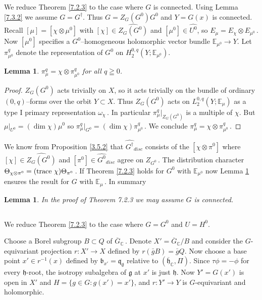\documentclass{conm-p-l}
\newtheorem{lemma}[equation]{Lemma}
\renewcommand{\gg}{\mathfrak{g}}
\newcommand{\gq}{\mathfrak{q}}
\def\gb{\mathfrak{b}}
\def\gg{\mathfrak{g}}
\def\gh{\mathfrak{h}}
\def\gq{\mathfrak{q}}
\def\trace{{\rm trace\,\,}}
\def\C{\mathbb{C}}
\def\E{\mathbb{E}}
\begin{document}
\subsection{}\label{ssec7d}\setcounter{equation}{0}
We reduce Theorem \ref{7.2.3} to the case where $G$
is connected.  Using Lemma \ref{7.3.2} we assume $G = G^\dagger$.  Thus
$G = Z_G(G^0)G^0$ and $Y = G(x)$ is connected.  Recall
$[\mu] = [\chi \otimes \mu^0]$ with $[\chi] \in \widehat{Z_G(G^0)}$
and $[\mu^0] \in \widehat{U^0}$, so $E_\mu = E_\chi \otimes E_{\mu^0}$\,.
Now $[\mu^0]$ specifies a $G^0$--homogeneous holomorphic vector
bundle $\E_{\mu^0} \to Y$.  Let $\pi^q_{\mu^0}$ denote the representation
of $G^0$ on $H^{0,q}_2(Y;\E_{\mu^0})$.

\begin{lemma}\label{7.4.1}
$\pi^q_{\mu} = \chi \otimes \pi^q_{\mu^0}$
for all $q \geqq 0$.
\end{lemma}

\begin{proof} $Z_G(G^0)$ acts trivially on $X$, so it acts trivially
on the bundle of ordinary $(0,q)$--forms over the orbit $Y \subset X$.
Thus $Z_G(G^0)$ acts on $L_2^{0,q}(Y;\E_\mu)$ as a type I primary 
representation $\omega_\chi$\,.  In particular $\pi_\mu^q|_{Z_G(G^0)}$ is 
a multiple of $\chi$.  But $\mu|_{U^0} = (\dim \chi)\mu^0$ so
$\pi_\mu^q|_{G^0} = (\dim \chi)\pi^q_{\mu^0}$\,.  We conclude $\pi_\mu^q
= \chi \otimes \pi^q_{\mu^0}$\,. 
\end{proof}

We know from Proposition \ref{3.5.2} that $\widehat{G^\dagger}_{disc}$ consists 
of the $[\chi \otimes \pi^0]$ where $[\chi] \in \widehat{Z_G(G^0)}$ and
$[\pi^0] \in \widehat{G^0}_{disc}$ agree on $Z_{G^0}$\,.  The distribution
character $\Theta_{\chi \otimes \pi^0} = (\trace \chi)\Theta_{\pi^0}$\,.
If Theorem \ref{7.2.3} holds for $G^0$ with $\E_{\mu^0}$ now 
Lemma \ref{7.4.1} ensures
the result for $G$ with $\E_\mu$\,.  In summary

\begin{lemma}\label{7.4.2}
In the proof of {\rm Theorem 7.2.3} we may 
assume $G$ is connected.
\end{lemma}

\subsection{}\label{ssec7e}\setcounter{equation}{0}
We reduce Theorem \ref{7.2.3} to the case where $G = G^0$
and $U = H^0$.

Choose a Borel subgroup $B \subset Q$ of $\overline{G}_\C$\,.  Denote 
$X' = \overline{G}_\C/B$ and consider the $G$-equivariant projection
$r: X' \to X$ defined by $r(\bar g B) = \bar g Q$.  Now choose a base
point $x' \in r^{-1}(x)$ defined by $\gb_{x'} = \gq_\emptyset$
relative to $(\overline{\gh}_\C, \Pi)$.
Since $\tau\phi = -\phi$ for every $\gh$-root, the isotropy subalgebra
of $\gg$ at $x'$ is just $\gh$.  Now 
$Y' = G(x')$ is open in $X'$ and
$H = \{g \in G : g(x') = x'\}$, and
$r:Y' \to Y$ is $G$-equivariant and holomorphic.
\end{document}
